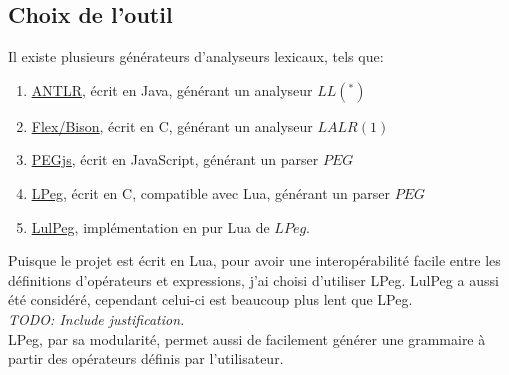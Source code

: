 \documentclass{article}
\begin{document}
\subsection{Choix de l'outil}
Il existe plusieurs générateurs d'analyseurs lexicaux, tels que: \begin{enumerate}
	\item \underline{\href{http://www.antlr.org/about.html}{ANTLR}}, écrit en Java, générant un analyseur $LL(^*)$
	\item \underline{\href{http://dinosaur.compilertools.net/}{Flex/Bison}}, écrit en C, générant un analyseur $LALR(1)$
	\item \underline{\href{https://pegjs.org/}{PEGjs}}, écrit en JavaScript, générant un parser $PEG$
	\item \underline{\href{https://github.com/LuaDist/lpeg}{LPeg}}, écrit en C, compatible avec Lua, générant un parser $PEG$
	\item \underline{\href{https://github.com/pygy/LuLPeg}{LulPeg}}, implémentation en pur Lua de $LPeg$.
\end{enumerate}
Puisque le projet est écrit en Lua, pour avoir une interopérabilité facile entre les définitions d'opérateurs et expressions, j'ai choisi d'utiliser LPeg. LulPeg a aussi été considéré, cependant celui-ci est beaucoup plus lent que LPeg. \\ \textit{TODO: Include justification.} \\ LPeg, par sa modularité, permet aussi de facilement générer une grammaire à partir des opérateurs définis par l'utilisateur.
\end{document}
